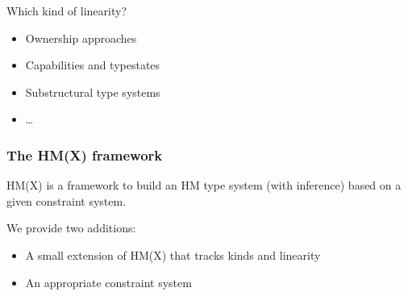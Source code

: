 \documentclass[xcolor=svgnames,11pt]{beamer}
\begin{document}
\begin{frame}
  Which kind of linearity?
  \begin{itemize}
  \item \alert<2>{Ownership approaches}

  \item \alert<3>{Capabilities and typestates}

  \item \alert<4,6>{Substructural type systems}

  \item \alert<5>{\dots}

  \end{itemize}
\end{frame}

\begin{frame}
  \frametitle{The HM(X) framework}
  HM(X) \citep{DBLP:journals/tapos/OderskySW99} is a framework
  to build an HM type system (with inference) based on a given constraint system.

  We provide two additions:
  \begin{itemize}
  \item A small extension of HM(X) that tracks kinds and linearity
  \item An appropriate constraint system
  \end{itemize}
\end{frame}



\end{document}
